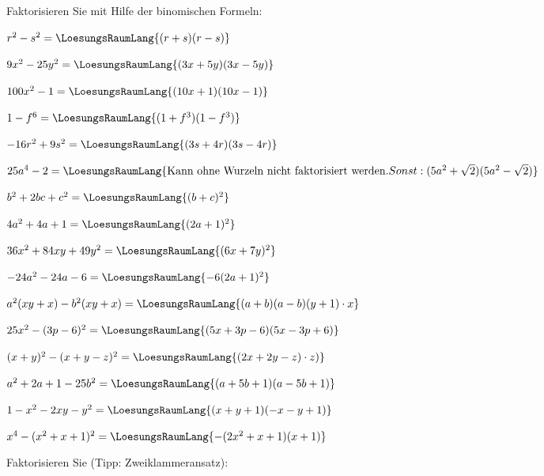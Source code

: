 \newpage





Faktorisieren Sie mit Hilfe der binomischen Formeln:


\begin{bbwAufgabenBlock}
\item $r^2-s^2 = \LoesungsRaumLang{(r+s)(r-s)}$
\item $9x^2 - 25y^2 = \LoesungsRaumLang{(3x+5y)(3x-5y)}$
\item $100x^2 -1 = \LoesungsRaumLang{(10x+1)(10x-1)}$
\item $1-f^6 = \LoesungsRaumLang{(1+f^3)(1-f^3)}$
\noTRAINER{\newpage}
\item $-16r^2 + 9s^2 = \LoesungsRaumLang{(3s+4r)(3s-4r)}$
\item $25a^4-2 =  \LoesungsRaumLang{\textrm{Kann ohne Wurzeln nicht faktorisiert werden}. Sonst: (5a^2 + \sqrt{2})(5a^2-\sqrt{2})}$
\item $b^2+2bc+c^2 = \LoesungsRaumLang{(b+c)^2}$
\item $4a^2+4a+1 = \LoesungsRaumLang{(2a+1)^2}$\noTRAINER{\newpage}
\item $36x^2 + 84xy + 49y^2 = \LoesungsRaumLang{(6x+7y)^2}$
\item $-24a^2 - 24a -6 = \LoesungsRaumLang{-6(2a+1)^2}$
\item $a^2(xy+x) - b^2(xy+x) = \LoesungsRaumLang{(a+b)(a-b)(y+1)\cdot{}x}$
\item $25x^2 - (3p-6)^2 = \LoesungsRaumLang{(5x+3p-6)(5x-3p+6)}$\noTRAINER{\newpage}
\item $(x+y)^2 - (x+y-z)^2 = \LoesungsRaumLang{(2x+2y-z)\cdot{}z)}$
\item $a^2+2a+1-25b^2 = \LoesungsRaumLang{(a+5b+1)(a-5b+1)}$
\item $1-x^2-2xy-y^2 = \LoesungsRaumLang{(x+y+1)(-x-y+1)}$
\item $x^4 - (x^2+x+1)^2 = \LoesungsRaumLang{-(2x^2+x+1)(x+1)}$
\end{bbwAufgabenBlock}

\newpage




Faktorisieren Sie (Tipp: Zweiklammeransatz):


